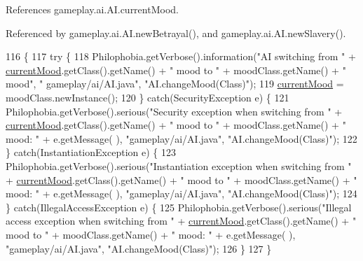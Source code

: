 References gameplay.\-ai.\-A\-I.\-current\-Mood.



Referenced by gameplay.\-ai.\-A\-I.\-new\-Betrayal(), and gameplay.\-ai.\-A\-I.\-new\-Slavery().


\begin{DoxyCode}
116                                                      \{  
117         \textcolor{keywordflow}{try} \{
118             Philophobia.getVerbose().information(\textcolor{stringliteral}{"AI switching from "} + 
      \hyperlink{classgameplay_1_1ai_1_1_a_i_aad698027b11d4b58a4da8c2952484ccb}{currentMood}.getClass().getName() + \textcolor{stringliteral}{" mood to "} + moodClass.getName() + \textcolor{stringliteral}{" mood"}, \textcolor{stringliteral}{"
      gameplay/ai/AI.java"}, \textcolor{stringliteral}{"AI.changeMood(Class)"});
119             \hyperlink{classgameplay_1_1ai_1_1_a_i_aad698027b11d4b58a4da8c2952484ccb}{currentMood} = moodClass.newInstance();
120         \} \textcolor{keywordflow}{catch}(SecurityException e) \{
121             Philophobia.getVerbose().serious(\textcolor{stringliteral}{"Security exception when switching from "} + 
      \hyperlink{classgameplay_1_1ai_1_1_a_i_aad698027b11d4b58a4da8c2952484ccb}{currentMood}.getClass().getName() + \textcolor{stringliteral}{" mood to "} + moodClass.getName() + \textcolor{stringliteral}{" mood: "} + e.getMessage(
      ), \textcolor{stringliteral}{"gameplay/ai/AI.java"}, \textcolor{stringliteral}{"AI.changeMood(Class)"});
122         \} \textcolor{keywordflow}{catch}(InstantiationException e) \{
123             Philophobia.getVerbose().serious(\textcolor{stringliteral}{"Instantiation exception when switching from "} + 
      \hyperlink{classgameplay_1_1ai_1_1_a_i_aad698027b11d4b58a4da8c2952484ccb}{currentMood}.getClass().getName() + \textcolor{stringliteral}{" mood to "} + moodClass.getName() + \textcolor{stringliteral}{" mood: "} + e.getMessage(
      ), \textcolor{stringliteral}{"gameplay/ai/AI.java"}, \textcolor{stringliteral}{"AI.changeMood(Class)"});
124         \} \textcolor{keywordflow}{catch}(IllegalAccessException e) \{
125             Philophobia.getVerbose().serious(\textcolor{stringliteral}{"Illegal access exception when switching from "} + 
      \hyperlink{classgameplay_1_1ai_1_1_a_i_aad698027b11d4b58a4da8c2952484ccb}{currentMood}.getClass().getName() + \textcolor{stringliteral}{" mood to "} + moodClass.getName() + \textcolor{stringliteral}{" mood: "} + e.getMessage(
      ), \textcolor{stringliteral}{"gameplay/ai/AI.java"}, \textcolor{stringliteral}{"AI.changeMood(Class)"});
126         \} 
127     \}
\end{DoxyCode}


